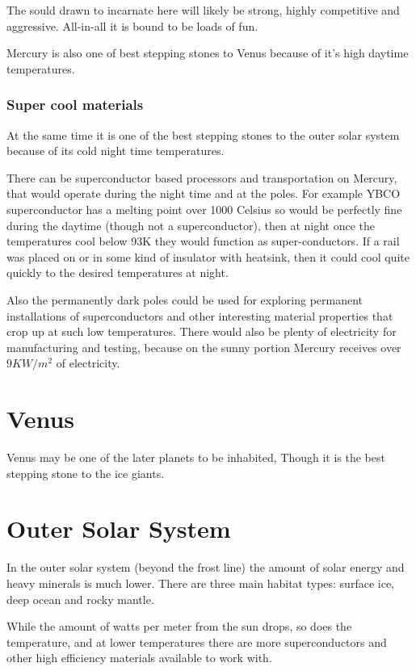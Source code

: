 The sould drawn to incarnate here will likely be strong, highly competitive and
aggressive. All-in-all it is bound to be loads of fun.

Mercury is also one of best stepping stones to Venus because of it's high
daytime temperatures.  

\subsubsection{Super cool materials}

At the same time it is one of the best stepping stones to
the outer solar system because of its cold night time temperatures. 

There can be superconductor based processors and transportation on
Mercury, that would operate during the night time and at the poles. 
For example YBCO superconductor has a melting point over 1000 Celsius 
so would be perfectly fine during the daytime (though not a superconductor), 
then at night once the temperatures cool below 93K they would function as
super-conductors.  If a rail was placed on or in some kind of insulator with
heatsink, then it could cool quite quickly to the desired temperatures at night.


Also the permanently dark poles could be used for exploring permanent
installations of superconductors and other interesting material properties that
crop up at such low temperatures.  There would also be plenty of electricity for
manufacturing and testing, because on the sunny portion Mercury receives over
$9KW/m^2$ of electricity. 


\section{Venus}

Venus may be one of the later planets to be inhabited, 
Though it is the best stepping stone to the ice giants.

\section{Outer Solar System}

In the outer solar system (beyond the frost line) the amount of solar energy 
and heavy minerals is much lower. There are three main habitat types: surface
ice, deep ocean and rocky mantle. 

While the amount of watts per meter from the sun drops, so does the temperature,
and at lower temperatures there are more superconductors and other high
efficiency materials available to work with.

